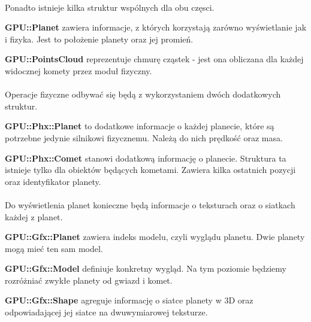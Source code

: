 \paragraph{}
Ponadto istnieje kilka struktur wspólnych dla obu częsci.

\begin{description}
\item{\bf GPU::Planet} zawiera informacje, z których korzystają zarówno wyświetlanie jak i fizyka. Jest to położenie planety oraz jej promień.
\item{\bf GPU::PointsCloud} reprezentuje chmurę cząstek - jest ona obliczana dla każdej widocznej komety przez moduł fizyczny.
\end{description}

\paragraph{}

Operacje fizyczne odbywać się będą z wykorzystaniem dwóch dodatkowych struktur.

\begin{description}
\item{\bf GPU::Phx::Planet} to dodatkowe informacje o każdej planecie, które są potrzebne jedynie silnikowi fizycznemu. Należą do nich prędkość oraz masa.
\item{\bf GPU::Phx::Comet} stanowi dodatkową informację o planecie. Struktura ta istnieje tylko dla obiektów będących kometami. Zawiera kilka ostatnich pozycji oraz identyfikator planety.
\end{description}

\paragraph{}

Do wyświetlenia planet konieczne będą informacje o teksturach oraz o siatkach każdej z planet.

\begin{description}
\item{\bf GPU::Gfx::Planet} zawiera indeks modelu, czyli wyglądu planetu. Dwie planety mogą mieć ten sam model.
\item{\bf GPU::Gfx::Model} definiuje konkretny wygląd. Na tym poziomie będziemy rozróżniać zwykłe planety od gwiazd i komet.
\item{\bf GPU::Gfx::Shape} agreguje informację o siatce planety w 3D oraz odpowiadającej jej siatce na dwuwymiarowej teksturze.
\end{description}

